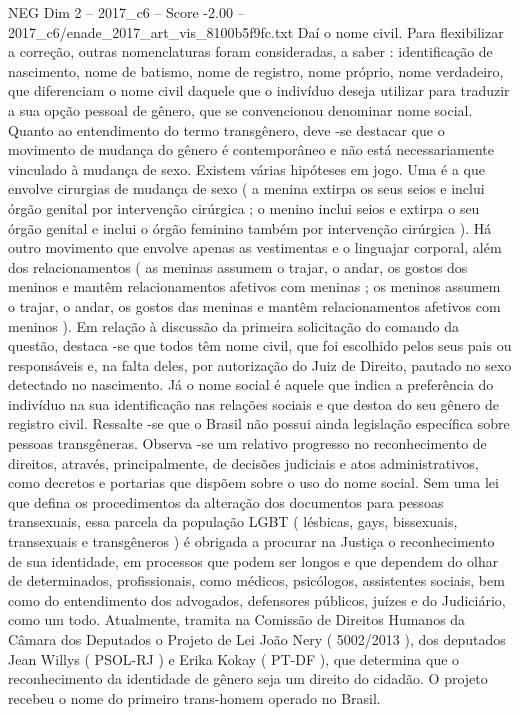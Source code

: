 \begin{textsample}{NEG Dim 2 – 2017\_c6 – Score -2.00 – 2017\_c6/enade\_2017\_art\_vis\_8100b5f9fc.txt}
Daí o nome civil.
Para flexibilizar a correção, outras nomenclaturas foram consideradas, a saber : identificação de nascimento, nome de batismo, nome de registro, nome próprio, nome verdadeiro, que diferenciam o nome civil daquele que o indivíduo deseja utilizar para traduzir a sua opção pessoal de gênero, que se convencionou denominar nome social.
Quanto ao entendimento do termo transgênero, deve -se destacar que o movimento de mudança do gênero é contemporâneo e não está necessariamente vinculado à mudança de sexo.
Existem várias hipóteses em jogo.
Uma é a que envolve cirurgias de mudança de sexo ( a menina extirpa os seus seios e inclui órgão genital por intervenção cirúrgica ; o menino inclui seios e extirpa o seu órgão genital e inclui o órgão feminino também por intervenção cirúrgica ).
Há outro movimento que envolve apenas as vestimentas e o linguajar corporal, além dos relacionamentos ( as meninas assumem o trajar, o andar, os gostos dos meninos e mantêm relacionamentos afetivos com meninas ; os meninos assumem o trajar, o andar, os gostos das meninas e mantêm relacionamentos afetivos com meninos ).
Em relação à discussão da primeira solicitação do comando da questão, destaca -se que todos têm nome civil, que foi escolhido pelos seus pais ou responsáveis e, na falta deles, por autorização do Juiz de Direito, pautado no sexo detectado no nascimento.
Já o nome social é aquele que indica a preferência do indivíduo na sua identificação nas relações sociais e que destoa do seu gênero de registro civil.
Ressalte -se que o Brasil não possui ainda legislação específica sobre pessoas transgêneras.
Observa -se um relativo progresso no reconhecimento de direitos, através, principalmente, de decisões judiciais e atos administrativos, como decretos e portarias que dispõem sobre o uso do nome social.
Sem uma lei que defina os procedimentos da alteração dos documentos para pessoas transexuais, essa parcela da população LGBT ( lésbicas, gays, bissexuais, transexuais e transgêneros ) é obrigada a procurar na Justiça o reconhecimento de sua identidade, em processos que podem ser longos e que dependem do olhar de determinados, profissionais, como médicos, psicólogos, assistentes sociais, bem como do entendimento dos advogados, defensores públicos, juízes e do Judiciário, como um todo.
Atualmente, tramita na Comissão de Direitos Humanos da Câmara dos Deputados o Projeto de Lei João Nery ( 5002/2013 ), dos deputados Jean Willys ( PSOL-RJ ) e Erika Kokay ( PT-DF ), que determina que o reconhecimento da identidade de gênero seja um direito do cidadão.
O projeto recebeu o nome do primeiro trans-homem operado no Brasil.

\end{textsample}
